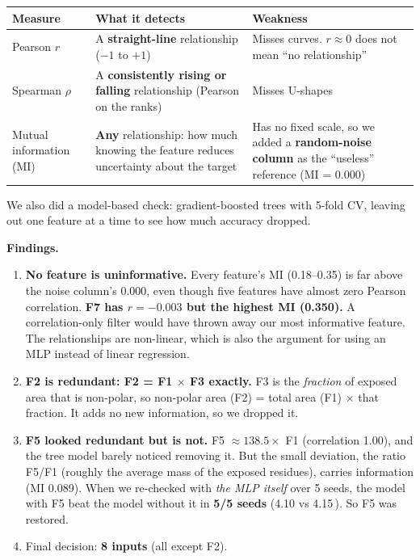 \documentclass[11pt,a4paper]{article}
\newcommand{\A}{\,\text{\AA}}
\begin{document}
\begin{tabularx}{\linewidth}{@{}lYY@{}}
\toprule
Measure & What it detects & Weakness \\
\midrule
Pearson $r$ & A \textbf{straight-line} relationship ($-1$ to $+1$) & Misses curves. $r \approx 0$ does not mean ``no relationship'' \\
Spearman $\rho$ & A \textbf{consistently rising or falling} relationship (Pearson on the ranks) & Misses U-shapes \\
Mutual information (MI) & \textbf{Any} relationship: how much knowing the feature reduces uncertainty about the target & Has no fixed scale, so we added a \textbf{random-noise column} as the ``useless'' reference (MI = 0.000) \\
\bottomrule
\end{tabularx}

We also did a model-based check: gradient-boosted trees with 5-fold CV, leaving out one feature at a time to see how
much accuracy dropped.

\textbf{Findings.}
\begin{enumerate}
  \item \textbf{No feature is uninformative.} Every feature's MI (0.18--0.35) is far above the noise column's 0.000,
        even though five features have almost zero Pearson correlation. \textbf{F7 has $r = -0.003$ but the highest MI
        (0.350).} A correlation-only filter would have thrown away our most informative feature. The relationships are
        non-linear, which is also the argument for using an MLP instead of linear regression.
  \item \textbf{F2 is redundant: F2 = F1 $\times$ F3 exactly.} F3 is the \emph{fraction} of exposed area that is non-polar,
        so non-polar area (F2) = total area (F1) $\times$ that fraction. It adds no new information, so we dropped it.
  \item \textbf{F5 looked redundant but is not.} F5 $\approx 138.5 \times$ F1 (correlation 1.00), and the tree model barely
        noticed removing it. But the small deviation, the ratio F5/F1 (roughly the average mass of the exposed residues),
        carries information (MI 0.089). When we re-checked with \emph{the MLP itself} over 5 seeds, the model with F5
        beat the model without it in \textbf{5/5 seeds} (4.10 vs 4.15\A). So F5 was restored.
  \item Final decision: \textbf{8 inputs} (all except F2).
\end{enumerate}
\end{document}

